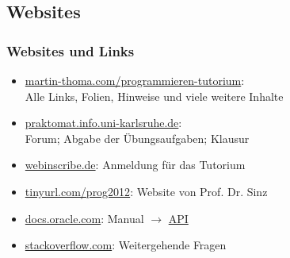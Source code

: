 \documentclass[usepdftitle=false,hyperref={pdfpagelabels=false}]{beamer}
\begin{document}
\subsection{Websites}
\begin{frame}
    \frametitle{Websites und Links}
    \begin{itemize}
      \item \href{http://martin-thoma.com/programmieren-tutorium}{martin-thoma.com/programmieren-tutorium}:\\
            Alle Links, Folien, Hinweise und viele weitere Inhalte
      \item \href{https://praktomat.info.uni-karlsruhe.de/}{praktomat.info.uni-karlsruhe.de}:\\
            Forum; Abgabe der Übungsaufgaben; Klausur
      \item \href{https://webinscribe.ira.uka.de/}{webinscribe.de}: Anmeldung für das Tutorium
      \item \href{http://verialg.iti.kit.edu/english/583.php}{tinyurl.com/prog2012}: Website von Prof. Dr. Sinz
      \item \href{http://docs.oracle.com/javase/7/docs/}{docs.oracle.com}: Manual $\rightarrow$ \href{http://docs.oracle.com/javase/7/docs/api/}{API}
      \item \href{http://stackoverflow.com/}{stackoverflow.com}: Weitergehende Fragen
    \end{itemize}
\end{frame}
\end{document}
